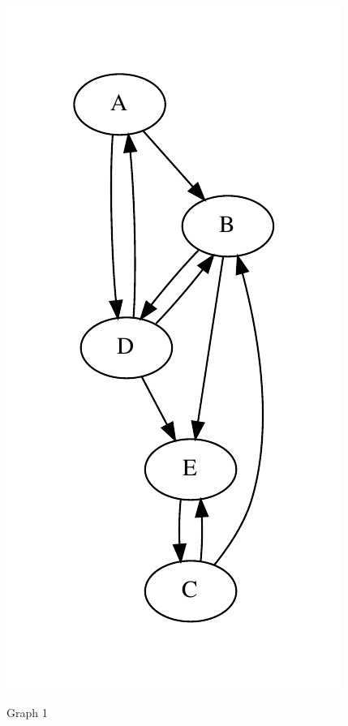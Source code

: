 \documentclass{article}
\begin{document}
\begin{figure}
\centering
\includegraphics[scale=0.5]{g1.pdf}
\label{Figure 1: }
\caption{Graph 1}
\end{figure}
\end{document}
